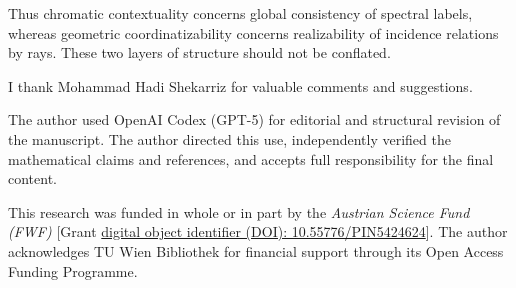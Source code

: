 \documentclass[aps,pra,twocolumn,superscriptaddress,10pt]{revtex4-2}
\begin{document}
Thus chromatic contextuality concerns global consistency of spectral labels,
whereas geometric coordinatizability concerns realizability of incidence
relations by rays.  These two layers of structure should not be conflated.


\begin{acknowledgments}
I thank Mohammad Hadi Shekarriz for valuable comments and suggestions.

The author used OpenAI Codex (GPT-5) for editorial and structural revision of
the manuscript.  The author directed this use, independently verified the
mathematical claims and references, and accepts full responsibility for the
final content.

This research was funded in whole or in part by the \textit{Austrian Science Fund (FWF)} [Grant \href{https://doi.org/10.55776/PIN5424624}{digital object identifier (DOI): 10.55776/PIN5424624}].
The author acknowledges TU Wien Bibliothek for financial support through its Open Access Funding Programme.
\end{acknowledgments}


\end{document}

